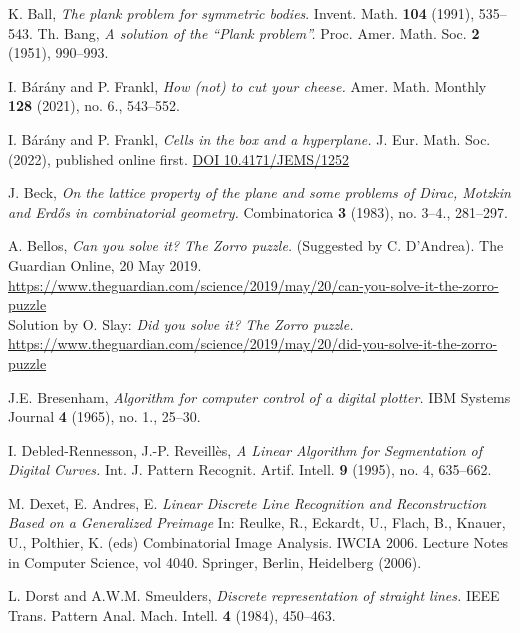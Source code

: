 \documentclass[11pt,a4paper]{amsart}
\begin{document}
\begin{thebibliography}{999999999}
 K. Ball, {\em The plank problem for symmetric bodies}. Invent. Math. {\bf 104} (1991), 535--543.
 Th. Bang, {\em A solution of the ``Plank problem''.} Proc. Amer. Math. Soc. {\bf 2} (1951),
990--993.

 I. Bárány and P. Frankl, {\em  How (not) to cut your cheese.} Amer. Math. Monthly {\bf 128} (2021), no. 6., 543--552.

 I. Bárány and P. Frankl, {\em  Cells in the box and a hyperplane.} J. Eur. Math. Soc. (2022), published online first.  \href{https://ems.press/journals/jems/articles/6159210}{DOI 10.4171/JEMS/1252}

 J. Beck, {\em On the lattice property of the plane and some problems of Dirac, Motzkin and Erdős in combinatorial geometry.} Combinatorica {\bf 3} (1983), no. 3--4., 281--297.

 A. Bellos, {\em Can you solve it? The Zorro puzzle.} (Suggested by C. D’Andrea).  The Guardian Online, 20 May 2019.\\
\href{https://www.theguardian.com/science/2019/may/20/can-you-solve-it-the-zorro-puzzle}{https://www.theguardian.com/science/2019/may/20/can-you-solve-it-the-zorro-puzzle}\\
Solution by O. Slay:
{\em Did you solve it? The Zorro puzzle.} \\
\href{https://www.theguardian.com/science/2019/may/20/did-you-solve-it-the-zorro-puzzle}{https://www.theguardian.com/science/2019/may/20/did-you-solve-it-the-zorro-puzzle}

 J.E. Bresenham, {\em Algorithm for computer control of a digital plotter.} IBM Systems Journal {\bf 4} (1965), no. 1., 25--30.

 I. Debled-Rennesson, J.-P. Reveillès, {\em 
A Linear Algorithm for Segmentation of Digital Curves.}
	Int. J. Pattern Recognit. Artif. Intell. {\bf 9} (1995), no. 4, 635--662.

 M. Dexet, E.  Andres, E. {\em Linear Discrete Line Recognition and Reconstruction Based on a Generalized Preimage} In: Reulke, R., Eckardt, U., Flach, B., Knauer, U., Polthier, K. (eds) Combinatorial Image Analysis. IWCIA 2006. Lecture Notes in Computer Science, vol 4040. Springer, Berlin, Heidelberg (2006).

  L. Dorst and A.W.M. Smeulders, {\em Discrete representation of straight lines.} IEEE Trans. Pattern Anal. Mach. Intell. {\bf 4} (1984), 450--463.


\end{thebibliography}
\end{document}
